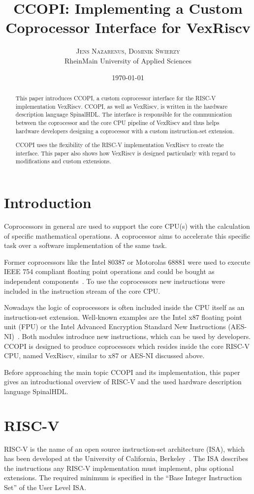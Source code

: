 \documentclass[twoside,twocolumn]{article}
\title{\vspace{-7mm}%
	\fontsize{24pt}{10pt}\selectfont
	\textbf{CCOPI: Implementing a Custom Coprocessor Interface for
    VexRiscv}
	}
\author{%
	\large
	\textsc{Jens Nazarenus, Dominik Swierzy} \\[2mm]
	\normalsize	RheinMain University of Applied Sciences \\
    \normalsize	\code{\{jens.nazarenus, dominik.swierzy\}@hs-rm.de}
	}
\date{\today}
\begin{document}
\maketitle

\begin{abstract}
\noindent This paper introduces CCOPI, a custom coprocessor interface for the
RISC-V implementation VexRiscv. CCOPI, as well as VexRiscv, is written in
the hardware description language SpinalHDL. The interface is responsible 
for the communication between the coprocessor and the core CPU pipeline of 
VexRiscv and thus helps hardware developers designing  
a coprocessor with a custom instruction-set extension.

CCOPI uses the flexibility of the RISC-V implementation VexRiscv to create 
the interface. This paper also shows how VexRiscv is designed particularly with 
regard to modifications and custom extensions. 
\end{abstract}

\section{Introduction}
Coprocessors in general are used to support the core CPU(s) with the
calculation of specific mathematical operations. A coprocessor aims to
accelerate this specific task over a software implementation of the same
task.

Former coprocessors like the Intel 80387 or Motorolas 68881 were used to
execute IEEE 754 compliant floating point operations and could be
bought as independent components~\cite{motorola, intel198780387}. To use the coprocessors new
instructions were included in the instruction stream of the core CPU.

Nowadays the logic of coprocessors is often included inside the CPU
itself as an instruction-set extension. Well-known examples are the
Intel\textregistered{} x87 
floating point unit (FPU) or the Intel\textregistered{} Advanced Encryption Standard New 
Instructions (AES-NI)~\cite{x87, aesni}. Both modules introduce new
instructions, which can
be used by developers.
CCOPI is designed to produce coprocessors which resides inside the core
RISC-V CPU, named VexRiscv, similar to x87 or AES-NI discussed above.

Before approaching the main topic CCOPI and its implementation, this paper
gives an introductional overview of RISC-V and the used
hardware description language SpinalHDL.
\section{RISC-V}
RISC-V is the name of an open source instruction-set architecture (ISA),
which has been developed at the University of California,
Berkeley~\cite{riscv}.
The ISA describes the instructions any RISC-V implementation must
implement, plus optional extensions. The required minimum is specified in
the ``Base Integer Instruction Set'' of the User Level ISA.
\end{document}
